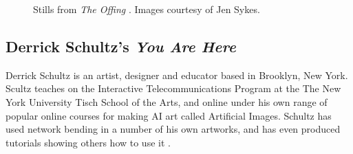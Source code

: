 \begin{figure}[!htbp]
    \caption[Stills from \textit{The Offing}.]{Stills from \textit{The Offing} \citep{sykes2022offing}. Images courtesy of Jen Sykes.}
    \label{fig:c7:offing}
 \end{figure}

\subsection{Derrick Schultz's \textit{You Are Here}}

Derrick Schultz is an artist, designer and educator based in Brooklyn, New York. Scultz teaches on the Interactive Telecommunications Program at the The New York University Tisch School of the Arts, and online under his own range of popular online courses for making AI art called Artificial Images. 
Schultz has used network bending in a number of his own artworks, and has even produced tutorials showing others how to use it \citep{schultz2020netbending}. 

